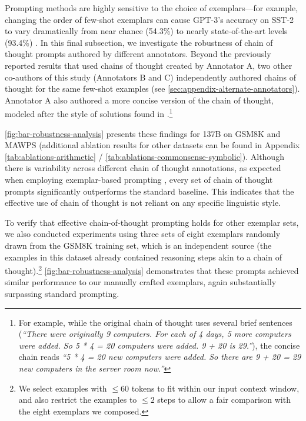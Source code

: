 Prompting methods are highly sensitive to the choice of exemplars—for example, changing the order of few-shot exemplars can cause GPT-3's accuracy on SST-2 to vary dramatically from near chance (54.3\%) to nearly state-of-the-art levels (93.4\%) \citep{zhao2021calibrate}. In this final subsection, we investigate the robustness of chain of thought prompts authored by different annotators. Beyond the previously reported results that used chains of thought created by Annotator A, two other co-authors of this study (Annotators B and C) independently authored chains of thought for the same few-shot examples (see \cref{sec:appendix-alternate-annotators}). Annotator A also authored a more concise version of the chain of thought, modeled after the style of solutions found in \citet{cobbe2021training}.\footnote{For example, while the original chain of thought uses several brief sentences (\textit{``There were originally 9 computers. For each of 4 days, 5 more computers were added. So 5 * 4 = 20 computers were added. 9 + 20 is 29.''}), the concise chain reads \textit{``5 * 4 = 20 new computers were added. So there are 9 + 20 = 29 new computers in the server room now.''}}

\cref{fig:bar-robustness-analysis} presents these findings for \lamda{} 137B on GSM8K and MAWPS (additional ablation results for other datasets can be found in Appendix \cref{tab:ablations-arithmetic} / \cref{tab:ablations-commonsense-symbolic}). Although there is variability across different chain of thought annotations, as expected when employing exemplar-based prompting \citep{le-scao-rush-2021-many,reynolds2021prompt,zhao2021calibrate}, every set of chain of thought prompts significantly outperforms the standard baseline. This indicates that the effective use of chain of thought is not reliant on any specific linguistic style.

To verify that effective chain-of-thought prompting holds for other exemplar sets, we also conducted experiments using three sets of eight exemplars randomly drawn from the GSM8K training set, which is an independent source (the examples in this dataset already contained reasoning steps akin to a chain of thought).\footnote{We select examples with $\leq 60$ tokens to fit within our input context window, and also restrict the examples to $\leq 2$ steps to allow a fair comparison with the eight exemplars we composed.} \cref{fig:bar-robustness-analysis} demonstrates that these prompts achieved similar performance to our manually crafted exemplars, again substantially surpassing standard prompting.

